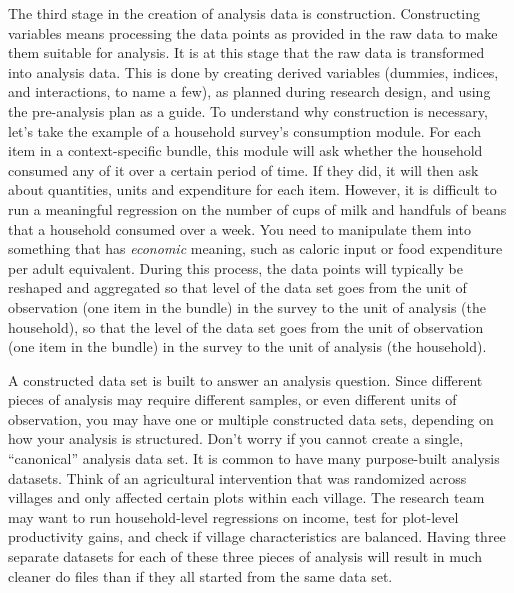 The third stage in the creation of analysis data is construction.
Constructing variables means processing the data points as provided in the raw data to make them suitable for analysis.
It is at this stage that the raw data is transformed into analysis data.
This is done by creating derived variables (dummies, indices, and interactions, to name a few),
as planned during research design,
and using the pre-analysis plan as a guide.
To understand why construction is necessary,
let's take the example of a household survey's consumption module.
For each item in a context-specific bundle,
this module will ask whether the household consumed any of it over a certain period of time.
If they did, it will then ask about quantities, units and expenditure for each item.
However, it is difficult to run a meaningful regression
on the number of cups of milk and handfuls of beans that a household consumed over a week.
You need to manipulate them into something that has \textit{economic} meaning,
such as caloric input or food expenditure per adult equivalent.
During this process, the data points will typically be reshaped and aggregated
so that level of the data set goes from the unit of observation
(one item in the bundle) in the survey to the unit of analysis (the household),
so that the level of the data set goes from the unit of observation (one item in the bundle)
in the survey to the unit of analysis (the household).

A constructed data set is built to answer an analysis question.
Since different pieces of analysis may require different samples,
or even different units of observation,
you may have one or multiple constructed data sets,
depending on how your analysis is structured.
Don't worry if you cannot create a single, ``canonical'' analysis data set.
It is common to have many purpose-built analysis datasets.
Think of an agricultural intervention that was randomized across villages
and only affected certain plots within each village.
The research team may want to run household-level regressions on income,
test for plot-level productivity gains,
and check if village characteristics are balanced.
Having three separate datasets for each of these three pieces of analysis
will result in much cleaner do files than if they all started from the same data set.

